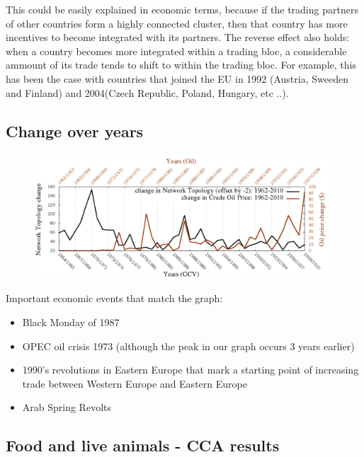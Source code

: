 \documentclass[11pt,a4paper,oneside]{report}
\begin{document}
This could be easily explained in economic terms, because if the trading partners of other countries form a highly connected cluster, then that country has more incentives to become integrated with its partners. The reverse effect also holds: when a country becomes more integrated within a trading bloc, a considerable ammount of its trade tends to shift to within the trading bloc. For example, this has been the case with countries that joined the EU in 1992 (Austria, Sweeden and Finland) and 2004(Czech Republic, Poland, Hungary, etc ..). 

\subsection*{Change over years}

\begin{figure}[H]
  \centering
\includegraphics[scale=0.4]
{../code/final_results/all_trade_thresh/change_over_time.png}
\caption{}
\label{fig:hsa_meta}
\end{figure}

Important economic events that match the graph:
\begin{itemize}
 \item Black Monday of 1987
 \item OPEC oil crisis 1973 (although the peak in our graph occurs 3 years earlier)
 \item 1990's revolutions in Eastern Europe that mark a starting point of 
 increasing trade between Western Europe and Eastern Europe
 \item Arab Spring Revolts
\end{itemize}


\subsection*{Food and live animals - CCA results}
\end{document}
